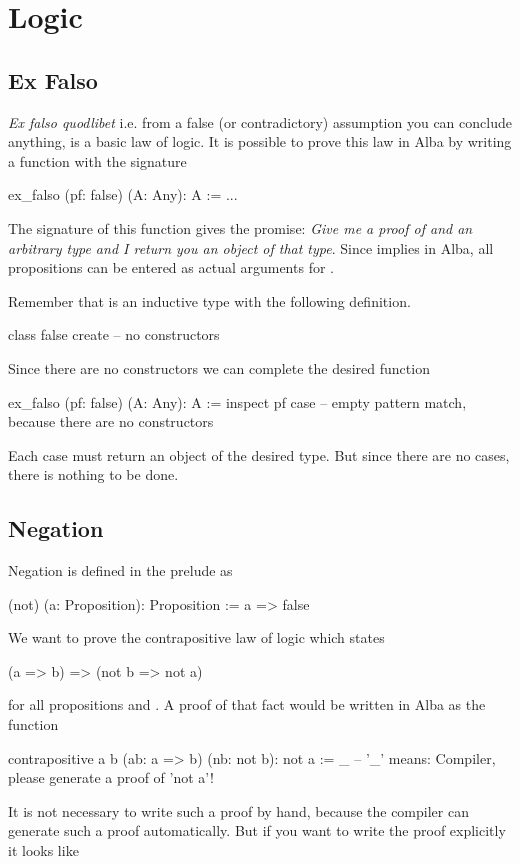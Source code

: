 \newpage
\section{Logic}
\label{sec:certprog-logic}



\subsection{Ex Falso}

\emph{Ex falso quodlibet} i.e. from a false (or contradictory) assumption you
can conclude anything, is a basic law of logic. It is possible to prove this
law in Alba by writing a function with the signature

\begin{alba}
  ex_falso (pf: false) (A: Any): A :=
    ...
\end{alba}
%
The signature of this function gives the promise: \emph{Give me a proof of
   and an arbitrary type and I return you an object of that
  type}. Since  implies  in Alba, all
propositions can be entered as actual arguments for .


Remember that  is an inductive type with the following definition.
\begin{alba}
  class false create
    -- no constructors
\end{alba}
%
Since there are no constructors we can complete the desired function

\begin{alba}
  ex_falso (pf: false) (A: Any): A :=
    inspect pf case
      -- empty pattern match, because there are no constructors
\end{alba}
%
Each case must return an object of the desired type. But since there are no
cases, there is nothing to be done.






\subsection{Negation}

Negation is defined in the prelude as
\begin{alba}
  (not) (a: Proposition): Proposition :=
    a => false
\end{alba}

We want to prove the contrapositive law of logic which states
\begin{alba}
  (a => b) => (not b => not a)
\end{alba}
for all propositions  and . A proof of that fact would be
written in Alba as the function
%
\begin{alba}
  contrapositive a b (ab: a => b) (nb: not b): not a :=
    _      -- '_' means: Compiler, please generate a proof of 'not a'!
\end{alba}
%
It is not necessary to write such a proof by hand, because the compiler can
generate such a proof automatically. But if you want to write the proof
explicitly it looks like

